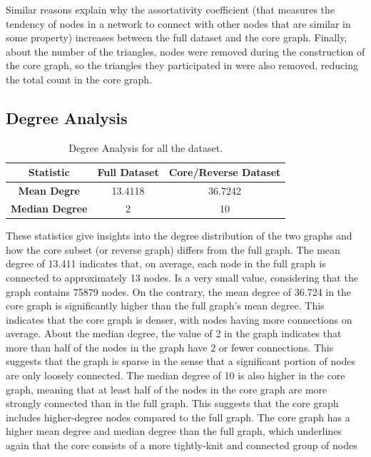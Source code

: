 \documentclass[conference]{IEEEtran}
\begin{document}
Similar reasons explain why the assortativity coefficient (that measures the tendency of nodes in a network to connect with other nodes that are similar in some property) increases between the full dataset and the core graph.
Finally, about the number of the triangles, nodes were removed during the construction of the core graph, so the triangles they participated in were also removed, reducing the total count in the core graph.

\subsection{Degree Analysis}

\begin{table}[h!]
\centering
\begin{tabular}{|c|c|c|}
\toprule
\textbf{Statistic} & \textbf{Full Dataset} & \textbf{Core/Reverse Dataset} \\
\midrule
\textbf{Mean Degre} & 13.4118 &  36.7242 \\
\textbf{Median Degree} & 2 & 10 \\
\bottomrule
\end{tabular}
\caption{Degree Analysis for all the dataset.}
\label{tab:degree_stats}
\end{table}

These statistics give insights into the degree distribution of the two graphs and how the core subset (or reverse graph) differs from the full graph. The mean degree of 13.411 indicates that, on average, each node in the full graph is connected to approximately 13 nodes. Is a very small value, considering that the graph contains 75879 nodes. On the contrary, the mean degree of 36.724 in the core graph is significantly higher than the full graph’s mean degree. This indicates that the core graph is denser, with nodes having more connections on average. About the median degree, the value of 2 in the graph indicates that more than half of the nodes in the graph have 2 or fewer connections. This suggests that the graph is sparse in the sense that a significant portion of nodes are only loosely connected. The median degree of 10 is also higher in the core graph, meaning that at least half of the nodes in the core graph are more strongly connected than in the full graph. This suggests that the core graph includes higher-degree nodes compared to the full graph.
The core graph has a higher mean degree and median degree than the full graph, which underlines again that the core consists of a more tightly-knit and connected group of nodes
\end{document}
